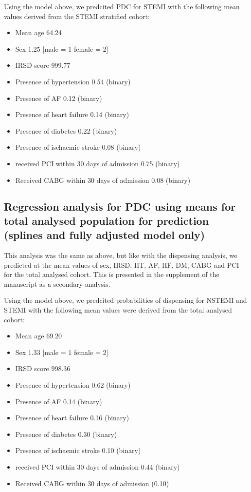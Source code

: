 \documentclass[11pt]{article}
\begin{document}
Using the model above, we predcited PDC for STEMI with the following mean values derived from the STEMI stratified cohort: \\
\begin{itemize}
\item Mean age 64.24
\item Sex 1.25 [male = 1 female = 2]
\item IRSD score 999.77
\item Presence of hypertension 0.54 (binary)
\item Presence of AF 0.12 (binary)
\item Presence of heart failure 0.14 (binary)
\item Presence of diabetes 0.22 (binary)
\item Presence of ischaemic stroke 0.08 (binary)
\item received PCI within 30 days of admission 0.75 (binary)
\item Received CABG within 30 days of admission 0.08 (binary)
\end{itemize}
\color{violet}
\begin{stlog}\end{stlog}
\color{black}
\subsection{Regression analysis for PDC using means for total analysed population for prediction (splines and fully adjusted model only)}
This analysis was the same as above, but like with the dispensing analysis, we predicted at the mean values of sex, IRSD, HT, AF, HF, DM, CABG and PCI for the total analysed cohort. This is presented in the supplement of the manuscript as a secondary analysis. 
\color{violet}
\begin{stlog}\end{stlog}
\color{black}
Using the model above, we predcited probabilities of dispensing for NSTEMI and STEMI with the following mean values were derived from the total analysed cohort: \\
\begin{itemize}
\item Mean age 69.20
\item Sex 1.33 [male = 1 female = 2]
\item IRSD score 998.36
\item Presence of hypertension 0.62 (binary)
\item Presence of AF 0.14 (binary)
\item Presence of heart failure 0.16 (binary)
\item Presence of diabetes 0.30 (binary)
\item Presence of ischaemic stroke 0.10 (binary)
\item received PCI within 30 days of admission 0.44 (binary)
\item Received CABG within 30 days of admission (0.10)
\end{itemize}
\color{violet}
\begin{stlog}\end{stlog}
\clearpage
\color{black}

\end{document}

